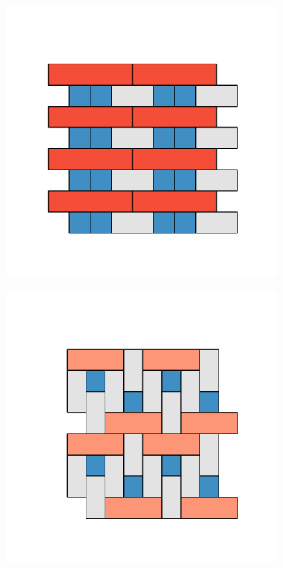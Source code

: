 \begin{figure}[bt]
	\vspace{2mm}               
      \begin{subfigure}[b]{0.16\textwidth}
         \centering
         \includegraphics[width=\textwidth]{./figures/procrystals/t2.pdf}
         \caption{}
         \label{fig:pro3pksq5}
     \end{subfigure}
  	\hfill
  	  \begin{subfigure}[b]{0.16\textwidth}
         \centering
         \includegraphics[width=\textwidth]{./figures/procrystals/t5.pdf}

\end{subfigure}
\end{figure}
